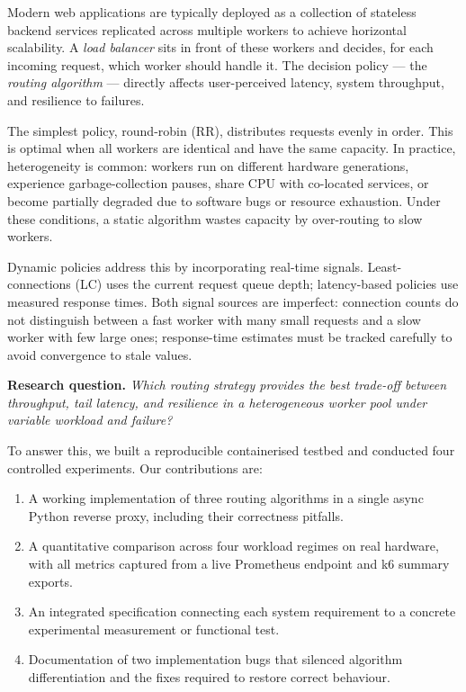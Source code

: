 \documentclass[conference]{IEEEtran}
\begin{document}
Modern web applications are typically deployed as a collection of
stateless backend services replicated across multiple workers to achieve
horizontal scalability. A \emph{load balancer} sits in front of these
workers and decides, for each incoming request, which worker should
handle it. The decision policy --- the \emph{routing algorithm} ---
directly affects user-perceived latency, system throughput, and
resilience to failures.

The simplest policy, round-robin (RR), distributes requests evenly in
order. This is optimal when all workers are identical and have the same
capacity. In practice, heterogeneity is common: workers run on different
hardware generations, experience garbage-collection pauses, share CPU
with co-located services, or become partially degraded due to software
bugs or resource exhaustion. Under these conditions, a static algorithm
wastes capacity by over-routing to slow workers.

Dynamic policies address this by incorporating real-time signals.
Least-connections (LC) uses the current request queue depth; latency-based
policies use measured response times. Both signal sources are imperfect:
connection counts do not distinguish between a fast worker with many
small requests and a slow worker with few large ones; response-time
estimates must be tracked carefully to avoid convergence to stale values.

\textbf{Research question.} \textit{Which routing strategy provides the
best trade-off between throughput, tail latency, and resilience in a
heterogeneous worker pool under variable workload and failure?}

To answer this, we built a reproducible containerised testbed and
conducted four controlled experiments. Our contributions are:
\begin{enumerate}
    \item A working implementation of three routing algorithms in a single
    async Python reverse proxy, including their correctness pitfalls.
    \item A quantitative comparison across four workload regimes on
    real hardware, with all metrics captured from a live Prometheus
    endpoint and k6 summary exports.
    \item An integrated specification connecting each system requirement
    to a concrete experimental measurement or functional test.
    \item Documentation of two implementation bugs that silenced
    algorithm differentiation and the fixes required to restore correct
    behaviour.
\end{enumerate}
\end{document}
